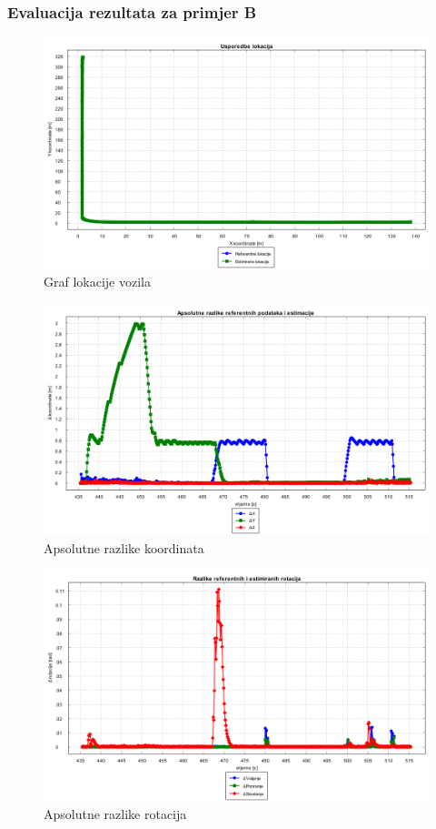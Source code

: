 \subsubsection{Evaluacija rezultata za primjer B}
\begin{figure}[H]
  \includegraphics[scale=0.4]{images/voxel/pr4/usporedba_lokacija.png}
  \caption{Graf lokacije vozila}
  \label{eval:a2p4_lokacija}
\end{figure}
\begin{figure}[H]
  \includegraphics[scale=0.4]{images/voxel/pr4/apsolutne_razlike_koordinata.png}
  \caption{Apsolutne razlike koordinata}
  \label{eval:a2p4_koord_razlike}
\end{figure}
\begin{figure}[H]
  \includegraphics[scale=0.4]{images/voxel/pr4/rotacije_razlike.png}
  \caption{Apsolutne razlike rotacija}
  \label{eval:a2p4_rot_razlike}
\end{figure}
